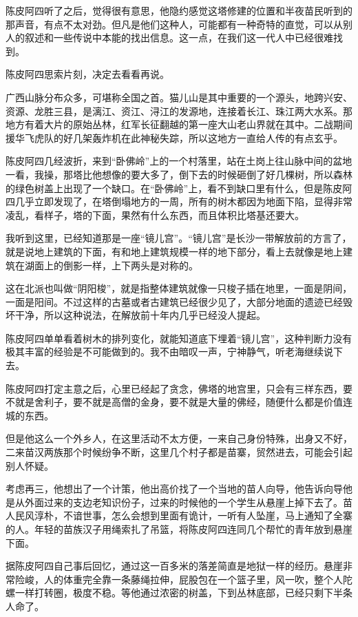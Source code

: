 陈皮阿四听了之后，觉得很有意思，他隐约感觉这塔修建的位置和半夜苗民听到的那声音，有点不太对劲。但凡是他们这种人，可能都有一种奇特的直觉，可以从别人的叙述和一些传说中本能的找出信息。这一点，在我们这一代人中已经很难找到。

陈皮阿四思索片刻，决定去看看再说。

广西山脉分布众多，可堪称全国之首。猫儿山是其中重要的一个源头，地跨兴安、资源、龙胜三县，是漓江、资江、浔江的发源地，连接着长江、珠江两大水系。那地方有着大片的原始丛林，红军长征翻越的第一座大山老山界就在其中。二战期间援华飞虎队的好几架轰炸机在此神秘失踪，所以这地方一直给人传的有点玄乎。

陈皮阿四几经波折，来到“卧佛岭”上的一个村落里，站在土岗上往山脉中间的盆地一看，我操，那塔比他想像的要大多了，倒下去的时候砸倒了好几棵树，所以森林的绿色树盖上出现了一个缺口。在“卧佛岭”上，看不到缺口里有什么，但是陈皮阿四几乎立即发现了，在塔倒塌地方的一周，所有的树木都因为地面下陷，显得非常凌乱，看样子，塔的下面，果然有什么东西，而且体积比塔基还要大。

我听到这里，已经知道那是一座“镜儿宫”。“镜儿宫”是长沙一带解放前的方言了，就是说地上建筑的下面，有和地上建筑规模一样的地下部分，看上去就像是地上建筑在湖面上的倒影一样，上下两头是对称的。

这在北派也叫做“阴阳梭”，就是指整体建筑就像一只梭子插在地里，一面是阴间，一面是阳间。不过这样的古墓或者古建筑已经很少见了，大部分地面的遗迹已经毁坏干净，所以这种说法，在解放前十年内几乎已经没人提起。

陈皮阿四单单看着树木的排列变化，就能知道底下埋着“镜儿宫”，这种判断力没有极其丰富的经验是不可能做到的。我不由暗叹一声，宁神静气，听老海继续说下去。

陈皮阿四打定主意之后，心里已经起了贪念，佛塔的地宫里，只会有三样东西，要不就是舍利子，要不就是高僧的金身，要不就是大量的佛经，随便什么都是价值连城的东西。

但是他这么一个外乡人，在这里活动不太方便，一来自己身份特殊，出身又不好，二来苗汉两族那个时候纷争不断，这里几个村子都是苗寨，贸然进去，可能会引起别人怀疑。

考虑再三，他想出了一个计策，他出高价找了一个当地的苗人向导，他告诉向导他是从外面过来的支边老知识份子，过来的时候他的一个学生从悬崖上掉下去了。苗人民风淳朴，不谙世事，怎么会想到里面有诡计，一听有人坠崖，马上通知了全寨的人。年轻的苗族汉子用绳索扎了吊篮，将陈皮阿四连同几个帮忙的青年放到悬崖下面。

据陈皮阿四自己事后回忆，通过这一百多米的落差简直是地狱一样的经历。悬崖非常险峻，人的体重完全靠一条藤绳拉伸，屁股包在一个篮子里，风一吹，整个人陀螺一样打转圈，极度不稳。等他通过浓密的树盖，下到丛林底部，已经只剩下半条人命了。

